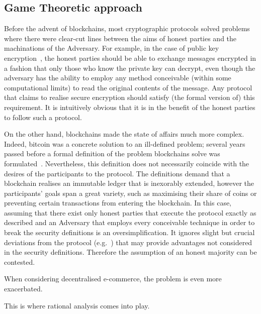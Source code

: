 \subsection{Game Theoretic approach}
  Before the advent of blockchains, most cryptographic protocols solved problems where
  there were clear-cut lines between the aims of honest parties and the machinations of
  the Adversary. For example, in the case of public key encryption~\cite{dh}, the honest
  parties should be able to exchange messages encrypted in a fashion that only those who
  know the private key can decrypt, even though the adversary has the ability to employ
  any method conceivable (within some computational limits) to read the original contents
  of the message. Any protocol that claims to realise secure encryption should satisfy
  (the formal version of) this requirement. It is intuitively obvious that it is in the
  benefit of the honest parties to follow such a protocol.

  On the other hand, blockchains made the state of affairs much more complex. Indeed,
  bitcoin was a concrete solution to an ill-defined problem; several years passed before a
  formal definition of the problem blockchains solve was formulated~\cite{backbone}.
  Nevertheless, this definition does not necessarily coincide with the desires of the
  participants to the protocol. The definitions demand that a blockchain realises an
  immutable ledger that is inexorably extended, however the participants' goals span a
  great variety, such as maximising their share of coins or preventing certain
  transactions from entering the blockchain. In this case, assuming that there exist only
  honest parties that execute the protocol exactly as described and an Adversary that
  employs every conceivable technique in order to break the security definitions is an
  oversimplification. It ignores slight but crucial deviations from the protocol
  (e.g.~\cite{selfishmine}) that may provide advantages not considered in the security
  definitions. Therefore the assumption of an honest majority can be contested.

  When considering decentralised e-commerce, the problem is even more exacerbated.

  This is where rational analysis comes into play.
